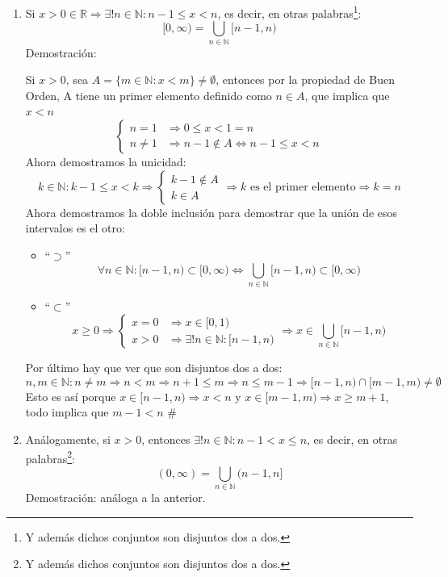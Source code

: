 \documentclass[10pt,a4paper,openright]{book}
\theoremstyle{break}
\begin{document}
\begin{enumerate}
\item Si $x>0\in \mathbb R\Rightarrow \exists! n \in \mathbb N: n-1\leq x< n$, es decir, en otras palabras\footnote{Y además dichos conjuntos son disjuntos dos a dos.}:
$$[0,\infty)=\bigcup_{n\in \mathbb N}[n-1,n)$$
Demostración:\par
Si $x>0$, sea $A=\{m\in \mathbb N: x<m\}\neq \emptyset$, entonces por la propiedad de Buen Orden, A tiene un primer elemento definido como $n\in A$, que implica que $x<n$
$$\begin{cases}n=1 &\Rightarrow 0\leq x<1=n\\
n\neq 1 &\Rightarrow n-1\notin A\Leftrightarrow n-1\leq x< n\end{cases}$$
Ahora demostramos la unicidad:
$$k\in \mathbb N: k-1\leq x<k\Rightarrow \begin{cases}k-1 \notin A \\ k \in A\end{cases}\Rightarrow k \mbox{ es el primer elemento}\Rightarrow k=n$$
Ahora demostramos la doble inclusión para demostrar que la unión de esos intervalos es el otro:
	\begin{itemize}
	\item ``$\supset$''
	$$\forall n \in \mathbb N: [n-1,n)\subset [0,\infty)\Leftrightarrow \bigcup_{n\in \mathbb N}[n-1,n) \subset [0,\infty)$$
	
	\item ``$\subset$''
	$$x\geq 0\Rightarrow \begin{cases} x=0 & \Rightarrow x\in [0,1) \\ x>0 & \Rightarrow \exists! n \in \mathbb N : [n-1,n)	
	\end{cases}\Rightarrow x\in \bigcup_{n\in \mathbb N}[n-1,n) $$
	\end{itemize}

Por último hay que ver que son disjuntos dos a dos:
$$n,m\in \mathbb N: n\neq m\Rightarrow n<m\Rightarrow n+1\leq m\Rightarrow n\leq m-1\Rightarrow [n-1,n)\cap [m-1,m)\neq \emptyset$$
Esto es así porque $x\in [n-1,n)\Rightarrow x<n$ y $x\in [m-1,m)\Rightarrow x\geq m+1$, todo implica que $m-1<n$ \#
\vspace{0.15cm}

\item Análogamente, si $x>0$, entonces $\exists! n \in \mathbb N: n-1< x\leq n$, es decir, en otras palabras\footnote{Y además dichos conjuntos son disjuntos dos a dos.}:
$$(0,\infty)=\bigcup_{n\in \mathbb N}(n-1,n]$$
Demostración: análoga a la anterior.
\vspace{0.15cm}


\end{enumerate}
\end{document}
